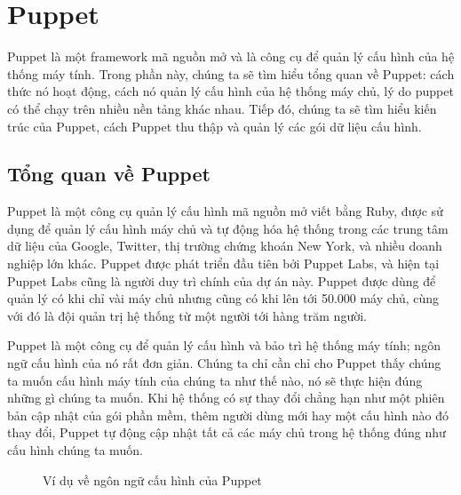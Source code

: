 \section{Puppet}
Puppet là một framework mã nguồn mở và là công cụ để quản lý cấu hình của hệ thống máy tính. Trong phần này, chúng ta sẽ tìm hiểu tổng quan về Puppet: cách thức nó hoạt động, cách nó quản lý cấu hình của hệ thống máy chủ, lý do puppet có thể chạy trên nhiều nền tảng khác nhau. Tiếp đó, chúng ta sẽ tìm hiểu kiến trúc của Puppet, cách Puppet thu thập và quản lý các gói dữ liệu cấu hình.

\subsection{Tổng quan về Puppet}
Puppet là một công cụ quản lý cấu hình mã nguồn mở viết bằng Ruby, được sử dụng để quản lý cấu hình máy chủ và tự động hóa hệ thống trong các trung tâm dữ liệu của Google, Twitter, thị trường chứng khoán New York, và nhiều doanh nghiệp lớn khác. Puppet được phát triển đầu tiên bởi Puppet Labs, và hiện tại Puppet Labs cũng là người duy trì chính của dự án này. Puppet được dùng để quản lý có khi chỉ vài máy chủ nhưng cũng có khi lên tới 50.000 máy chủ, cùng với đó là đội quản trị hệ thống từ một người tới hàng trăm người.

Puppet là một công cụ để quản lý cấu hình và bảo trì hệ thống máy tính; ngôn ngữ cấu hình của nó rất đơn giản. Chúng ta chỉ cần chỉ cho Puppet thấy chúng ta muốn cấu hình máy tính của chúng ta như thế nào, nó sẽ thực hiện đúng những gì chúng ta muốn. Khi hệ thống có sự thay đổi chẳng hạn như một phiên bản cập nhật của gói phần mềm, thêm người dùng mới hay một cấu hình nào đó thay đổi, Puppet tự động cập nhật tất cả các máy chủ trong hệ thống đúng như cấu hình chúng ta muốn.

\begin{figure}[htb]
    \begin{center}
    \end{center}
    \caption{Ví dụ về ngôn ngữ cấu hình của Puppet}
    \label{fig:puppet_ssh_pp}
\end{figure}

